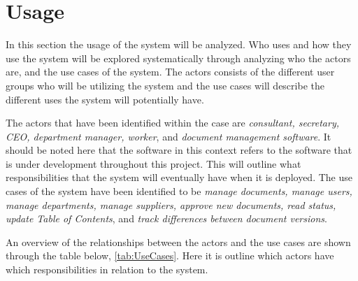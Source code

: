 \section{Usage}\label{sec:Usage}

In this section the usage of the system will be analyzed.
Who uses and how they use the system will be explored systematically through analyzing who the actors are, and the use cases of the system.
The actors consists of the different user groups who will be utilizing the system and the use cases will describe the different uses the system will potentially have.

The actors that have been identified within the case are \textit{consultant, secretary, CEO, department manager, worker}, and \textit{document management software}.
It should be noted here that the software in this context refers to the software that is under development throughout this project.
This will outline what responsibilities that the system will eventually have when it is deployed.
The use cases of the system have been identified to be \textit{manage documents, manage users, manage departments, manage suppliers, approve new documents, read status, update Table of Contents}, and \textit{track differences between document versions}.

An overview of the relationships between the actors and the use cases are shown through the table below, \cref{tab:UseCases}.
Here it is outline which actors have which responsibilities in relation to the system.

